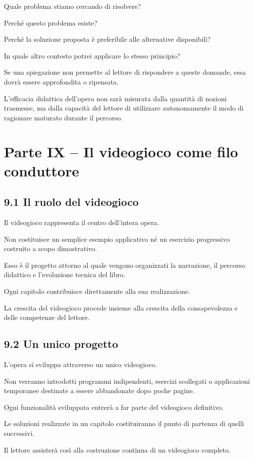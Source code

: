 \documentclass{article}
\begin{document}
Quale problema stiamo cercando di risolvere?

Perché questo problema esiste?

Perché la soluzione proposta è preferibile alle alternative disponibili?

In quale altro contesto potrei applicare lo stesso principio?

Se una spiegazione non permette al lettore di rispondere a queste domande, essa dovrà essere approfondita o ripensata.

L'efficacia didattica dell'opera non sarà misurata dalla quantità di nozioni trasmesse, ma dalla capacità del lettore di
utilizzare autonomamente il modo di ragionare maturato durante il percorso.

\section{Parte IX – Il videogioco come filo conduttore}
\subsection{9.1 Il ruolo del videogioco}
Il videogioco rappresenta il centro dell'intera opera.

Non costituisce un semplice esempio applicativo né un esercizio progressivo costruito a scopo dimostrativo.

Esso è il progetto attorno al quale vengono organizzati la narrazione, il percorso didattico e l'evoluzione tecnica del
libro.

Ogni capitolo contribuisce direttamente alla sua realizzazione.

La crescita del videogioco procede insieme alla crescita della consapevolezza e delle competenze del lettore.

\subsection{9.2 Un unico progetto}
L'opera si sviluppa attraverso un unico videogioco.

Non verranno introdotti programmi indipendenti, esercizi scollegati o applicazioni temporanee destinate a essere
abbandonate dopo poche pagine.

Ogni funzionalità sviluppata entrerà a far parte del videogioco definitivo.

Le soluzioni realizzate in un capitolo costituiranno il punto di partenza di quelli successivi.

Il lettore assisterà così alla costruzione continua di un videogioco completo.
\end{document}

